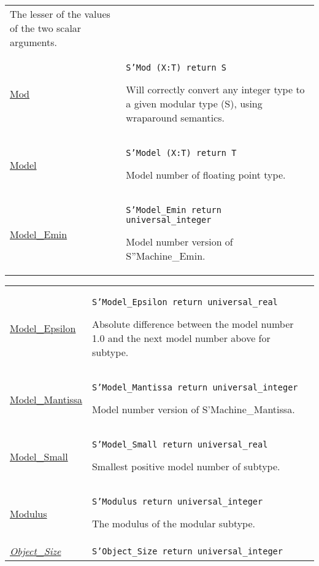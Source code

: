 \documentclass[english]{article}
\begin{document}
\begin{scriptsize}
\begin{multicols*}{3}
\begin{tabular}{@{}p{2cm}p{6.5cm}}
   The lesser of the values of the two scalar arguments.\\

   \href{http://www.ada-auth.org/standards/22rm/html/RM-K-2.html}{Mod} & \texttt{S'Mod (X:T) return S}

   Will correctly convert any integer type to a given modular type (S), using wraparound semantics.\\

   \href{http://www.ada-auth.org/standards/22rm/html/RM-K-2.html}{Model} & \texttt{S'Model (X:T) return T}

   Model number of floating point type.\\

   \href{http://www.ada-auth.org/standards/22rm/html/RM-K-2.html}{Model\_Emin} & \texttt{S'Model\_Emin return universal\_integer}

   Model number version of S''Machine\_Emin.\\

\end{tabular}
\begin{tabular}{@{}p{2cm}p{6.5cm}}

   \href{http://www.ada-auth.org/standards/22rm/html/RM-K-2.html}{Model\_Epsilon} & \texttt{S'Model\_Epsilon return universal\_real}

   Absolute difference between the model number 1.0 and the next model number above for subtype.\\

   \href{http://www.ada-auth.org/standards/22rm/html/RM-K-2.html}{Model\_Mantissa} & \texttt{S'Model\_Mantissa return universal\_integer}

   Model number version of S'Machine\_Mantissa.\\

   \href{http://www.ada-auth.org/standards/22rm/html/RM-K-2.html}{Model\_Small} & \texttt{S'Model\_Small return universal\_real}

   Smallest positive model number of subtype.\\

   \href{http://www.ada-auth.org/standards/22rm/html/RM-K-2.html}{Modulus} & \texttt{S'Modulus return universal\_integer}

   The modulus of the modular subtype.\\

   \href{http://www.ada-auth.org/standards/22rm/html/RM-K-2.html}{\textit{Object\_Size}} & \texttt{S'Object\_Size return universal\_integer}


\end{tabular}
\end{multicols*}
\end{scriptsize}
\end{document}
